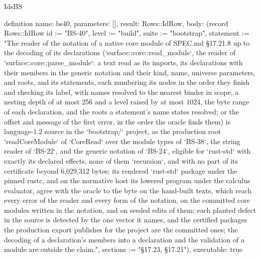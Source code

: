 \begin{lexlean}{IdsBS}
\begin{semanticmodule}
definition{
  name: bs40,
  parameters: [],
  result: Rows::IdRow,
  body: (record Rows::IdRow {id := "BS-40", level := "build", suite := "bootstrap", statement := "The reader of the notation of a native core module of SPEC.md §17.21.8 up to the decoding of its declarations (`surface::core::read_module`, the reader of `surface::core::parse_module`: a text read as its imports, its declarations with their members in the generic notation and their kind, name, universe parameters, and roots, and its statements, each numbering its nodes in the order they finish and checking its label, with names resolved to the nearest binder in scope, a nesting depth of at most 256 and a level raised by at most 1024, the byte range of each declaration, and the roots a statement's name states resolved; or the offset and message of the first error, in the order the oracle finds them) is language-1.2 source in the `bootstrap/` project, as the production root `readCoreModule` of `CoreRead` over the module types of `BS-38`, the string reader of `BS-22`, and the generic notation of `BS-24`, eligible for `rust-std` with exactly its declared effects, none of them `recursion`, and with no part of its certificate beyond 6,029,312 bytes; its rendered `rust-std` package under the pinned rustc, and on the normative host its lowered program under the calculus evaluator, agree with the oracle to the byte on the hand-built texts, which reach every error of the reader and every form of the notation, on the committed core modules written in the notation, and on seeded edits of them; each planted defect in the source is detected by the one vector it names, and the certified packages the production export publishes for the project are the committed ones; the decoding of a declaration's members into a declaration and the validation of a module are outside the claim.", sections := "§17.23, §17.21"}),
  executable: true
}


\end{semanticmodule}
\end{lexlean}
